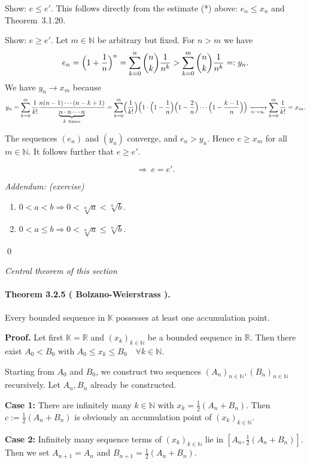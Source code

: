 \documentclass[12pt]{article}
\newcommand{\N}{\mathbb{N}}
\newcommand{\R}{\mathbb{R}}
\newcommand{\K}{\mathbb{K}} %
\newcommand{\NumberedTheorem}[3]{%
\paragraph*{Theorem #1 ( #2 ).} #3\par}
\begin{document}
\begin{enumerate}[label=(\arabic*),leftmargin=*]
Show: $e \le e'$. This follows directly from the estimate (*) above: $e_n \le x_n$ and Theorem~3.1.20.

Show: $e \ge e'$. Let $m\in\N$ be arbitrary but fixed. For $n>m$ we have
\[
    e_n = \Bigl(1 + \frac{1}{n}\Bigr)^n
    = \sum_{k=0}^{n} \binom{n}{k} \frac{1}{n^k}
    > \sum_{k=0}^{m} \binom{n}{k} \frac{1}{n^k}
    =: y_n.
\]
We have $y_n \to x_m$ because
\[
    y_n
    = \sum_{k=0}^{m} \frac{1}{k!} \frac{n(n-1)\cdots (n-k+1)}{\underbrace{n\cdot n\cdots n}_{k\ \text{times}}}
    = \sum_{k=0}^{m} \Bigl(\frac{1}{k!}\Bigr)
    \Bigl(1\cdot\Bigl(1-\frac{1}{n}\Bigr)\Bigl(1-\frac{2}{n}\Bigr)\cdots\Bigl(1-\frac{k-1}{n}\Bigr)\Bigr)
    \xrightarrow[n\to\infty]{}
    \sum_{k=0}^{m} \frac{1}{k!}
    = x_m.
\]

The sequences $(e_n)$ and $(y_n)$ converge, and $e_n > y_n$. Hence $e \ge x_m$ for all $m\in\N$. It follows further that $e \ge e'$.

\[
\Longrightarrow\ e = e'.
\]
\end{enumerate}

\textit{Addendum: (exercise)}
\begin{enumerate}[label=(\arabic*),leftmargin=*]
    \item $0<a<b \Longrightarrow 0<\sqrt[n]{a}<\sqrt[n]{b}$.
    \item $0<a\le b \Longrightarrow 0<\sqrt[n]{a}\le\sqrt[n]{b}$.
\end{enumerate}
\qed

\begin{center}
\textit{Central theorem of this section}
\end{center}

\NumberedTheorem{3.2.5}{Bolzano-Weierstrass}{
Every bounded sequence in $\K$ possesses at least one accumulation point.}

\noindent\textbf{Proof.} Let first $\K = \R$ and $(x_k)_{k \in \N}$ be a bounded sequence in $\R$. Then there exist $A_0 < B_0$ with $A_0 \le x_k \le B_0 \quad \forall k \in \N$.

Starting from $A_0$ and $B_0$, we construct two sequences $(A_n)_{n \in \N}, (B_n)_{n \in \N}$ recursively. Let $A_n, B_n$ already be constructed.

\textbf{Case 1:} There are infinitely many $k \in \N$ with $x_k = \frac{1}{2}(A_n + B_n)$. Then $c := \frac{1}{2}(A_n + B_n)$ is obviously an accumulation point of $(x_k)_{k \in \N}$.

\textbf{Case 2:} Infinitely many sequence terms of $(x_k)_{k \in \N}$ lie in $[A_n, \frac{1}{2}(A_n + B_n)]$. Then we set $A_{n+1} = A_n$ and $B_{n+1} = \frac{1}{2}(A_n + B_n)$.
\end{document}
